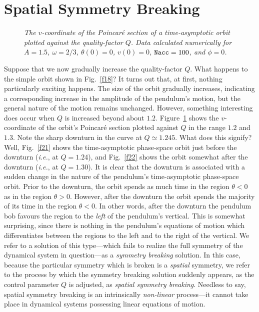 \section{Spatial Symmetry Breaking}
\begin{figure}
\epsfysize=3in
\centerline{}
\caption{\em The $v$-coordinate of the Poincar\'{e} section of a time-asymptotic orbit
plotted against the quality-factor $Q$. Data
 calculated numerically for
$A=1.5$, $\omega=2/3$, $\theta(0)=0$, $v(0)=0$, ${\tt Nacc} =100$, and $\phi=0$. }\label{f20}
\end{figure}
Suppose that we now gradually increase the quality-factor $Q$. What happens to the
simple orbit shown in Fig.~\ref{f18}? It turns out that, at first,  nothing particularly exciting
happens. The size of the orbit gradually increases, indicating a corresponding increase in
the amplitude of the pendulum's motion, but the general nature of the motion remains unchanged.
However, something interesting does occur when $Q$ is increased beyond about $1.2$. 
Figure~\ref{f20} shows the $v$-coordinate of the orbit's Poincar\'{e} section  plotted
against  $Q$ in the range $1.2$ and $1.3$. Note the sharp downturn
in the curve at $Q\simeq 1.245$. What does this signify? Well, Fig.~\ref{f21} shows
 the time-asymptotic phase-space orbit just before the downturn ({\em i.e.}, 
at $Q=1.24$), and Fig.~\ref{f22} shows the orbit somewhat after the downturn
({\em i.e.}, at $Q=1.30$). It is clear that the downturn is associated with a
sudden change in the nature of the pendulum's time-asymptotic phase-space orbit. Prior to the downturn, the orbit
spends as much time in the region $\theta<0$ as in the region $\theta>0$. However,
after the downturn the orbit spends the majority of its time in the region $\theta<0$. 
In other words, after the downturn the pendulum bob favours the region to the {\em left} of
the pendulum's vertical. This is somewhat surprising, since there is nothing in the
pendulum's equations of motion which differentiates between the regions to the left
and to the right of the vertical. We refer to a solution of this type---which fails
to realize the full symmetry of the dynamical system in question---as a {\em symmetry
breaking} solution. In this case, because the particular symmetry which is broken is
a {\em spatial} symmetry, we refer to the process by which the symmetry breaking solution
suddenly appears, as the control parameter $Q$ is adjusted, as {\em spatial symmetry breaking}.
Needless to say, spatial symmetry breaking is an intrinsically {\em non-linear} process---it
cannot take place in dynamical systems possessing linear equations of motion.


